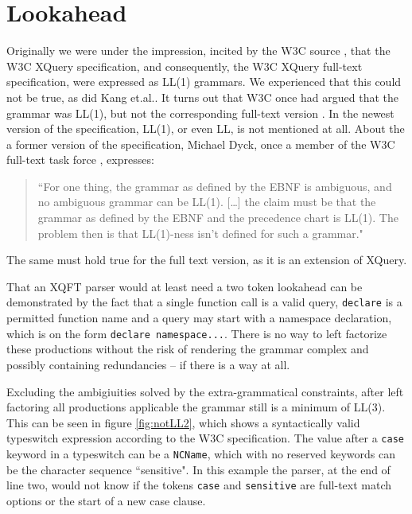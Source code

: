 \section{Lookahead}
\label{sect:discussion:lookahead}
Originally we were under the impression, incited by the W3C source
\cite{createTokenizer}, that the W3C XQuery specification, and consequently,
the W3C XQuery full-text specification, were expressed as LL(1) grammars. We
experienced that this could not be true, as did Kang
et.al.\cite{kang_xquery_diglib}. It turns out that W3C once had argued that the
grammar was LL(1), but not the corresponding full-text version
\cite{grammarIsLL1}. In the newest version of the specification, LL(1), or even
LL, is not mentioned at all. About the a former version of the specification, 
Michael Dyck, once a member of the W3C full-text task force
\cite{dyckIsTaskForce}, expresses\cite{dyckOnList}:

\begin{quote}
``For one thing, the grammar as defined by the EBNF is ambiguous, and no ambiguous grammar can be LL(1). [\ldots] the claim must be that the grammar as defined by the EBNF and the precedence chart is LL(1). The problem then is that LL(1)-ness isn't defined for such a grammar."
\end{quote}
The same must hold true for the full text version, as it is an extension of XQuery.

That an XQFT parser would at least need a two token lookahead can be
demonstrated by the fact that a single function call is a valid query, \verb!declare! is a permitted function
name and a query may start with a namespace declaration, which is on the form 
\verb!declare namespace...!. There is no way to left factorize these productions without the risk of
rendering the grammar complex and possibly containing redundancies -- if there is a way at all.

Excluding the ambigiuities solved by the extra-grammatical constraints, after left factoring all productions applicable the grammar still is a minimum of LL(3). This can be seen in figure \ref{fig:notLL2}, which shows a syntactically valid typeswitch expression according to the W3C specification. The value after a \verb!case! keyword in a typeswitch can be a \verb!NCName!, which with no reserved keywords can be the character sequence ``sensitive". In this example the parser, at the end of line two, would not know if the tokens \verb!case! and \verb!sensitive! are full-text match options or the start of a new case clause.

